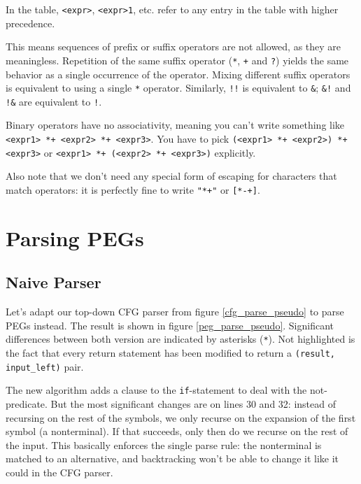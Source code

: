 In the table, \texttt{<expr>}, \texttt{<expr>1}, etc. refer to any entry in the
table with higher precedence.

This means sequences of prefix or suffix operators are not allowed, as they are
meaningless. Repetition of the same suffix operator (\texttt{*}, \texttt{+} and
\texttt{?}) yields the same behavior as a single occurrence of the
operator. Mixing different suffix operators is equivalent to using a single
\texttt{*} operator. Similarly, \texttt{!!} is equivalent to \texttt{\&};
\texttt{\&!} and \texttt{!\&} are equivalent to \texttt{!}.

Binary operators have no associativity, meaning you can't write something like
\texttt{<expr1> *+ <expr2> *+ <expr3>}. You have to pick \texttt{(<expr1> *+
  <expr2>) *+ <expr3>} or \texttt{<expr1> *+ (<expr2> *+ <expr3>)} explicitly.

Also note that we don't need any special form of escaping for characters that
match operators: it is perfectly fine to write \verb|"*+"| or \verb|[*-+]|.

\section{Parsing PEGs}
\label{parsing_peg}

\subsection{Naive Parser}

Let's adapt our top-down CFG parser from figure \ref{cfg_parse_pseudo} to
parse PEGs instead. The result is shown in figure \ref{peg_parse_pseudo}.
Significant differences between both version are indicated by asterisks
(\texttt{*}). Not highlighted is the fact that every return statement has been
modified to return a \lstinline{(result, input_left)} pair.

The new algorithm adds a clause to the \texttt{if}-statement to deal with the
not-predicate. But the most significant changes are on lines 30 and 32: instead
of recursing on the rest of the symbols, we only recurse on the expansion of the
first symbol (a nonterminal). If that succeeds, only then do we recurse on the
rest of the input. This basically enforces the single parse rule: the
nonterminal is matched to an alternative, and backtracking won't be able to
change it like it could in the CFG parser.

